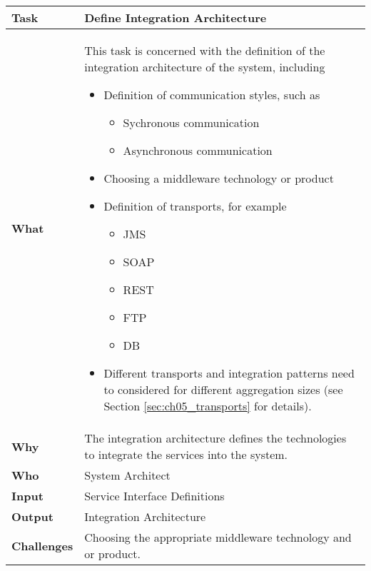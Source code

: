 \begin{tabularx}{\textwidth}{@{} l X @{}}
	\caption{Define Integration Architecture} \label{table:ch6_Task_Define_Integration_Architecture}\\
	\toprule
	\bfseries Task & Define Integration Architecture\\
	\midrule
	\bfseries What &
	This task is concerned with the definition of the integration architecture of the system, including
	\begin{itemize}
		\item Definition of communication styles, such as
		\begin{itemize}
			\item Sychronous communication
			\item Asynchronous communication
		\end{itemize}
		\item Choosing a middleware technology or product
		\item Definition of transports, for example
		\begin{itemize}
			\item \ac{JMS}
			\item SOAP
			\item \ac{REST}
			\item \ac{FTP}
			\item \ac{DB}
		\end{itemize}
		\item Different transports and integration patterns need to considered for different aggregation sizes (see Section \ref{sec:ch05_transports} for details).
	\end{itemize}
	\\
	\midrule
	\bfseries Why & The integration architecture defines the technologies to integrate the services into the system.\\
	\midrule
	\bfseries Who & System Architect\\
	\midrule 
	\bfseries Input & Service Interface Definitions
	\\
	\midrule 
	\bfseries Output & Integration Architecture\\
	\midrule
	\bfseries Challenges & Choosing the appropriate middleware technology and or product.\\
	\bottomrule
\end{tabularx}

